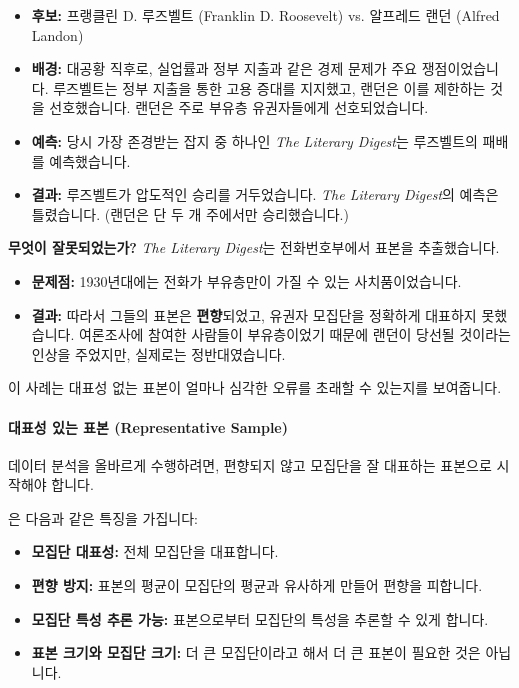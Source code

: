 \documentclass[11pt,a4paper]{article}
\theoremstyle{definition}
\begin{document}
\begin{tcolorbox}[infobox, title={1936년 미국 대통령 선거 (1936 Presidential Election)}]
\begin{itemize}
    \item \textbf{후보:} 프랭클린 D. 루즈벨트 (Franklin D. Roosevelt) vs. 알프레드 랜던 (Alfred Landon)
    \item \textbf{배경:} 대공황 직후로, 실업률과 정부 지출과 같은 경제 문제가 주요 쟁점이었습니다. 루즈벨트는 정부 지출을 통한 고용 증대를 지지했고, 랜던은 이를 제한하는 것을 선호했습니다. 랜던은 주로 부유층 유권자들에게 선호되었습니다.
    \item \textbf{예측:} 당시 가장 존경받는 잡지 중 하나인 \textit{The Literary Digest}는 루즈벨트의 패배를 예측했습니다.
    \item \textbf{결과:} 루즈벨트가 압도적인 승리를 거두었습니다. \textit{The Literary Digest}의 예측은 틀렸습니다. (랜던은 단 두 개 주에서만 승리했습니다.)
\end{itemize}
\end{tcolorbox}

\begin{examplebox}
\textbf{무엇이 잘못되었는가?}
\textit{The Literary Digest}는 전화번호부에서 표본을 추출했습니다.
\begin{itemize}
    \item \textbf{문제점:} 1930년대에는 전화가 부유층만이 가질 수 있는 사치품이었습니다.
    \item \textbf{결과:} 따라서 그들의 표본은 \textbf{편향}되었고, 유권자 모집단을 정확하게 대표하지 못했습니다. 여론조사에 참여한 사람들이 부유층이었기 때문에 랜던이 당선될 것이라는 인상을 주었지만, 실제로는 정반대였습니다.
\end{itemize}
이 사례는 대표성 없는 표본이 얼마나 심각한 오류를 초래할 수 있는지를 보여줍니다.
\end{examplebox}

\paragraph{대표성 있는 표본 (Representative Sample)}
데이터 분석을 올바르게 수행하려면, 편향되지 않고 모집단을 잘 대표하는 표본으로 시작해야 합니다.

\begin{tcolorbox}[infobox, title={대표성 있는 표본 (Representative Sample)}]
은 다음과 같은 특징을 가집니다:
\begin{itemize}
    \item \textbf{모집단 대표성:} 전체 모집단을 대표합니다.
    \item \textbf{편향 방지:} 표본의 평균이 모집단의 평균과 유사하게 만들어 편향을 피합니다.
    \item \textbf{모집단 특성 추론 가능:} 표본으로부터 모집단의 특성을 추론할 수 있게 합니다.
    \item \textbf{표본 크기와 모집단 크기:} 더 큰 모집단이라고 해서 더 큰 표본이 필요한 것은 아닙니다.
\end{itemize}
\end{tcolorbox}
\end{document}
